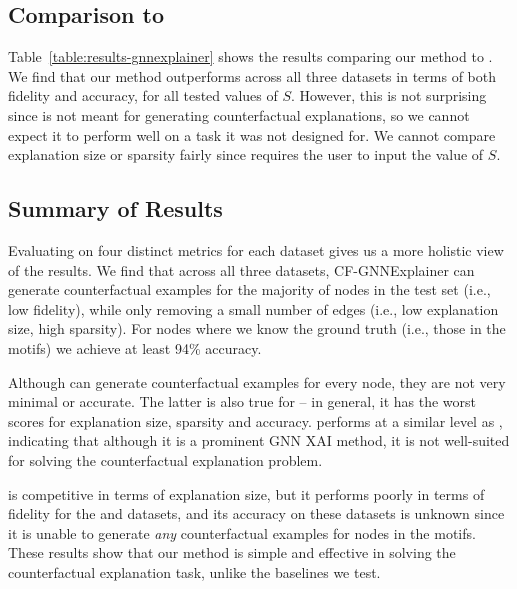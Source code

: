 






\subsection{Comparison to \gnnexplainer{}}
Table~\ref{table:results-gnnexplainer} shows the results comparing our method to \gnnexplainer{}. We find that our method outperforms \gnnexplainer{} across all three datasets in terms of both fidelity and accuracy, for all tested values of $S$. 
However, this is not surprising since \gnnexplainer{} is not meant for generating counterfactual explanations, so we cannot expect it to perform well on a task it was not designed for. 
We cannot compare explanation size or sparsity fairly since \gnnexplainer{} requires the user to input the value of $S$. 





\subsection{Summary of Results} 
Evaluating on four distinct metrics for each dataset gives us a more holistic view of the results. 
We find that across all three datasets, CF-GNNExplainer can generate counterfactual examples for the majority of nodes in the test set (i.e., low fidelity), while only removing a small number of edges (i.e., low explanation size, high sparsity). For nodes where we know the ground truth (i.e., those in the motifs) we achieve at least 94\% accuracy. 

Although \baserand{} can generate counterfactual examples for every node, they are not very minimal or accurate. 
The latter is also true for \basekeep{} -- in general, it has the worst scores for explanation size, sparsity and accuracy. 
\gnnexplainer{} performs at a similar level as \basekeep{}, indicating that although it is a prominent GNN XAI method, it is not well-suited for solving the counterfactual explanation problem. 

\baserm{} is competitive in terms of explanation size, but it performs poorly in terms of fidelity for the \synfour{} and \synfive{} datasets, and its accuracy on these datasets is unknown since it is unable to generate \emph{any} counterfactual examples for nodes in the motifs. 
These results show that our method is simple and effective in solving the counterfactual explanation task, unlike the baselines we test. 









